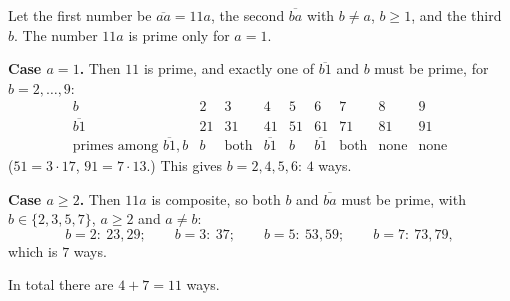 Let the first number be $\overline{aa}=11a$, the second $\overline{ba}$ with $b\ne a$, $b\ge1$, and the third $b$. The number $11a$ is prime only for $a=1$.

\textbf{Case $a=1$.} Then $11$ is prime, and exactly one of $\overline{b1}$ and $b$ must be prime, for $b=2,\dots,9$:
\[
\begin{array}{c|cccccccc}
b&2&3&4&5&6&7&8&9\\\hline
\overline{b1}&21&31&41&51&61&71&81&91\\
\text{primes among }\overline{b1},b&b&\text{both}&\overline{b1}&b&\overline{b1}&\text{both}&\text{none}&\text{none}
\end{array}
\]
($51=3\cdot17$, $91=7\cdot13$.) This gives $b=2,4,5,6$: $4$ ways.

\textbf{Case $a\ge2$.} Then $11a$ is composite, so both $b$ and $\overline{ba}$ must be prime, with $b\in\{2,3,5,7\}$, $a\ge2$ and $a\ne b$:
\[
b=2:\ 23,29;\qquad b=3:\ 37;\qquad b=5:\ 53,59;\qquad b=7:\ 73,79,
\]
which is $7$ ways.

In total there are $4+7=\boxed{11}$ ways.
